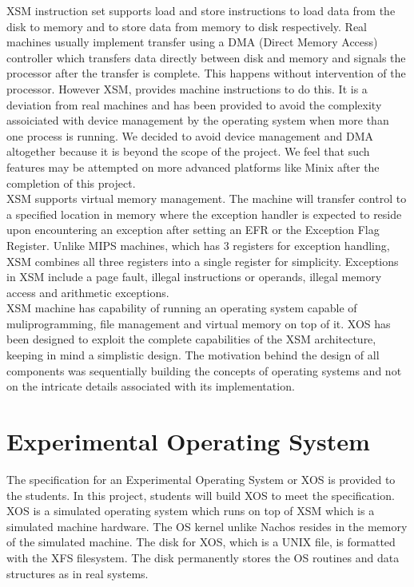 \documentclass{sig-alternate}
\begin{document}
XSM instruction set supports load and store instructions to load data from the disk to memory and to store data from memory to disk respectively. Real machines usually implement transfer using a DMA (Direct Memory Access) controller which transfers data directly between disk and memory and signals the processor after the transfer is complete. This happens without intervention of the processor. However XSM, provides machine instructions to do this. It is a deviation from real machines and has been provided to avoid the complexity assoiciated with device management by the operating system when more than one process is running. We decided to avoid device management and DMA altogether because it is beyond the scope of the project. We feel that such features may be attempted on more advanced platforms like Minix after the completion of this project. \\

XSM supports virtual memory management. The machine will transfer control to a specified location in memory where the exception handler is expected to reside upon encountering an exception after setting an EFR or the Exception Flag Register. Unlike MIPS machines\cite{mips}, which has 3 registers for exception handling, XSM combines all three registers into a single register for simplicity. Exceptions in XSM include a page fault, illegal instructions or operands, illegal memory access and arithmetic exceptions. \\

XSM machine has capability of running an operating system capable of muliprogramming, file management and virtual memory on top of it. XOS has been designed to exploit the complete capabilities of the XSM architecture, keeping in mind a simplistic design. The motivation behind the design of all components was sequentially building the concepts of operating systems and not on the intricate details associated with its implementation.


\section{Experimental Operating System }

The specification for an Experimental Operating System or XOS is provided to the students. In this project, students will build XOS to meet the specification. XOS is a simulated operating system which runs on top of XSM which is a simulated machine hardware. The OS kernel unlike Nachos \cite{nachos} resides in the memory of the simulated machine. The disk for XOS, which is a UNIX file,  is formatted with the XFS filesystem. The disk permanently stores the OS routines and data structures as in real systems.  \\
\end{document}
